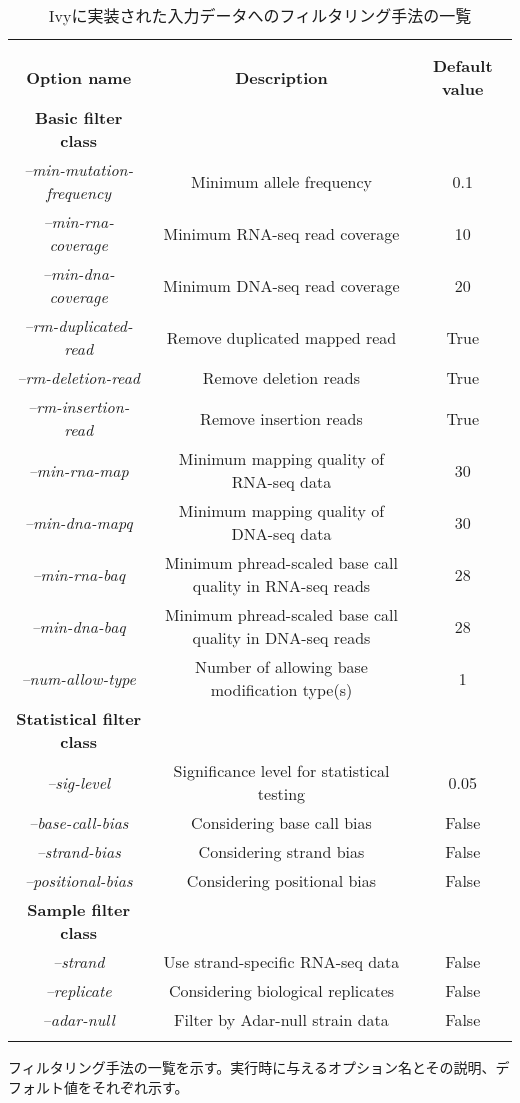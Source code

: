 \begin{longtable}{ccc}
	\vspace{-0.5cm}
	\label{tab:darned}\\
	\caption{Ivyに実装された入力データへのフィルタリング手法の一覧}\\
	\cline{1-3}
	\textbf{Option name} & \textbf{Description} & \textbf{Default value}\\
	\textbf{Basic filter class} \\
	\cline{1-3}
	\textit{--min-mutation-frequency} & Minimum allele frequency & 0.1 \\
	\textit{--min-rna-coverage} & Minimum RNA-seq read coverage & 10 \\
	\textit{--min-dna-coverage} & Minimum DNA-seq read coverage	& 20\\
	\textit{--rm-duplicated-read} & Remove duplicated mapped read & True \\
	\textit{--rm-deletion-read} & Remove deletion reads & True\\
	\textit{--rm-insertion-read} & Remove insertion reads & True\\
	\textit{--min-rna-map} & Minimum mapping quality of RNA-seq data & 30\\
	\textit{--min-dna-mapq} & Minimum mapping quality of DNA-seq data & 30\\
	\textit{--min-rna-baq} & Minimum phread-scaled base call quality in RNA-seq reads & 28\\
	\textit{--min-dna-baq} &Minimum phread-scaled base call quality in DNA-seq reads & 28\\
	\textit{--num-allow-type} & Number of allowing base modification type(s) & 1\\
	\textbf{Statistical filter class} \\
	\cline{1-3}
	\textit{--sig-level} & Significance level for statistical testing & 0.05\\
	\textit{--base-call-bias} & Considering base call bias & False\\
	\textit{--strand-bias} & Considering strand bias & False\\
	\textit{--positional-bias} & Considering positional bias & False\\
	\textbf{Sample filter class} \\
	\cline{1-3}
	\textit{--strand} & Use strand-specific RNA-seq data & False\\
	\textit{--replicate} & Considering biological replicates & False\\
	\textit{--adar-null} & Filter by Adar-null strain data & False\\
	\cline{1-3}
	\vspace{-0.8cm}
\end{longtable}
\begin{flushleft}
	\small{フィルタリング手法の一覧を示す。実行時に与えるオプション名とその説明、デフォルト値をそれぞれ示す。}
\end{flushleft}


